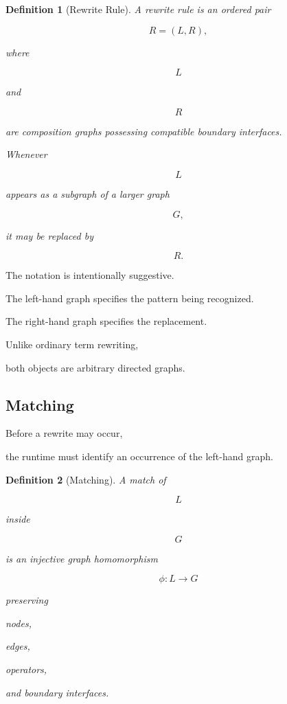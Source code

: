 \documentclass[12pt,oneside]{article}
\newtheorem{definition}{Definition}[section]
\begin{document}
\begin{definition}[Rewrite Rule]

A rewrite rule is an ordered pair

\[
R=(L,R),
\]

where

\[
L
\]

and

\[
R
\]

are composition graphs possessing compatible boundary interfaces.

Whenever

\[
L
\]

appears as a subgraph of a larger graph

\[
G,
\]

it may be replaced by

\[
R.
\]

\end{definition}

The notation is intentionally suggestive.

The left-hand graph specifies the pattern being recognized.

The right-hand graph specifies the replacement.

Unlike ordinary term rewriting,

both objects are arbitrary directed graphs.

\subsection{Matching}

Before a rewrite may occur,

the runtime must identify an occurrence of the left-hand graph.

\begin{definition}[Matching]

A match of

\[
L
\]

inside

\[
G
\]

is an injective graph homomorphism

\[
\phi
:
L
\rightarrow
G
\]

preserving

nodes,

edges,

operators,

and boundary interfaces.

\end{definition}
\end{document}
